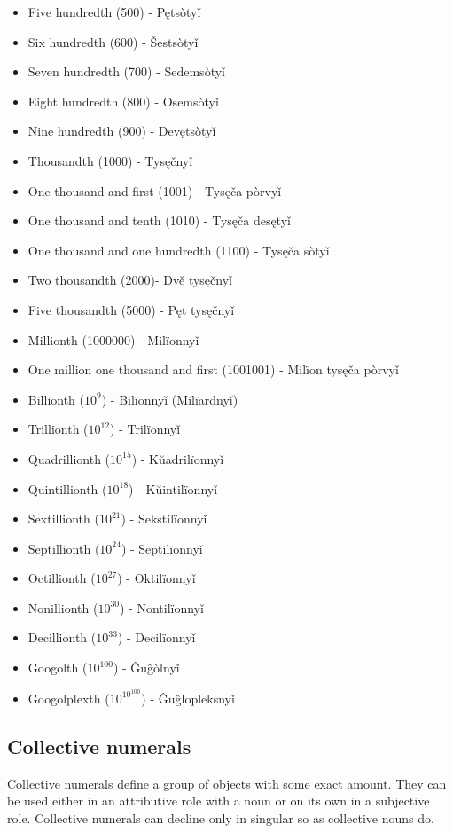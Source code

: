 \begin{itemize}
	\item Five hundredth (500) - Pętsòtyǐ
	\item Six hundredth (600) - Šestsòtyǐ
	\item Seven hundredth (700) - Sedemsòtyǐ
	\item Eight hundredth (800) - Osemsòtyǐ
	\item Nine hundredth (900) - Devętsòtyǐ
	\item Thousandth (1000) - Tysęčnyǐ
	\item One thousand and first (1001) - Tysęča pòrvyǐ
	\item One thousand and tenth (1010) - Tysęča desętyǐ
	\item One thousand and one hundredth (1100) - Tysęča sòtyǐ
	\item Two thousandth (2000)- Dvě tysęčnyǐ
	\item Five thousandth (5000) - Pęt tysęčnyǐ
	\item Millionth (1000000) - Milïonnyǐ
	\item One million one thousand and first (1001001) - Milïon tysęča pòrvyǐ
	\item Billionth ($10^9$) - Bilïonnyǐ (Milïardnyǐ)
	\item Trillionth ($10^{12}$) - Trilïonnyǐ
	\item Quadrillionth ($10^{15}$) - Kŭadrilïonnyǐ
	\item Quintillionth ($10^{18}$) - Kŭintilïonnyǐ
	\item Sextillionth ($10^{21}$) - Sekstilïonnyǐ
	\item Septillionth ($10^{24}$) - Septilïonnyǐ
	\item Octillionth ($10^{27}$) - Oktilïonnyǐ
	\item Nonillionth ($10^{30}$) - Nontilïonnyǐ
	\item Decillionth ($10^{33}$) - Decilïonnyǐ
	\item Googolth ($10^{100}$) - Ĝuĝòlnyǐ
	\item Googolplexth ($10^{10^{100}}$) - Ĝuĝlopleksnyǐ
\end{itemize}

\subsection{Collective numerals}

Collective numerals define a group of objects with some exact amount. They can be used either in an attributive role with a noun or on its own in a subjective role. Collective numerals can decline only in singular so as collective nouns do. 

